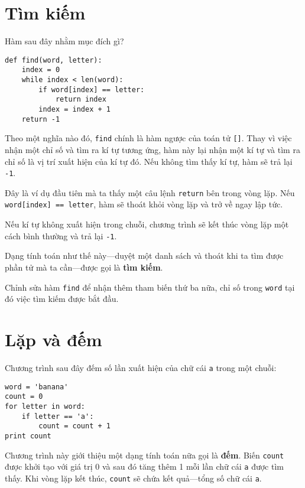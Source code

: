 \documentclass[11pt]{book}
\begin{document}


\section{Tìm kiếm}
\label{find}

Hàm sau đây nhằm mục đích gì?


\beforeverb
\begin{verbatim}
def find(word, letter):
    index = 0
    while index < len(word):
        if word[index] == letter:
            return index
        index = index + 1
    return -1
\end{verbatim}
\afterverb
%
Theo một nghĩa nào đó, {\tt find} chính là hàm ngược của toán tử {\tt []}.
Thay vì việc nhận một chỉ số và tìm ra kí tự tương ứng, hàm này lại nhận
một kí tự và tìm ra chỉ số là vị trí xuất hiện của kí tự đó. Nếu không tìm
thấy kí tự, hàm sẽ trả lại {\tt -1}.

Đây là ví dụ đầu tiên mà ta thấy một câu lệnh {\tt return} bên trong
vòng lặp. Nếu {\tt word[index] == letter}, hàm sẽ thoát khỏi vòng lặp
và trở về ngay lập tức.

Nếu kí tự không xuất hiện trong chuỗi, chương trình sẽ kết thúc vòng lặp
một cách bình thường và trả lại {\tt -1}.

Dạng tính toán như thế này---duyệt một danh sách và thoát khi ta tìm được
phần tử mà ta cần---được gọi là {\bf tìm kiếm}.


\begin{ex}
Chỉnh sửa hàm {\tt find} để nhận thêm tham biến thứ ba nữa, chỉ số
trong {\tt word} tại đó việc tìm kiếm được bắt đầu.
\end{ex}


\section{Lặp và đếm}
\label{counter}


Chương trình sau đây đếm số lần xuất hiện của chữ cái {\tt a}
trong một chuỗi:

\beforeverb
\begin{verbatim}
word = 'banana'
count = 0
for letter in word:
    if letter == 'a':
        count = count + 1
print count
\end{verbatim}
\afterverb
%
Chương trình này giới thiệu một dạng tính toán nữa gọi là  {\bf
đếm}.  Biến {\tt count} được khởi tạo với giá trị 0 và sau đó
tăng thêm 1 mỗi lần chữ cái {\tt a} được tìm thấy. Khi vòng lặp
kết thúc, {\tt count} sẽ chứa kết quả---tổng số chữ cái {\tt a}.
\end{document}
